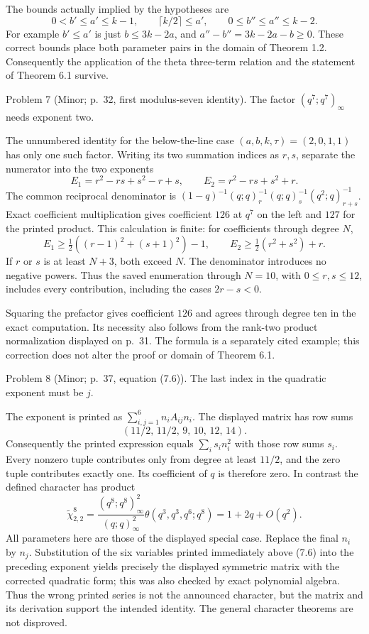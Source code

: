 \documentclass[10pt]{article}
\begin{document}
The bounds actually implied by the hypotheses are \[0<b'\le a'\le k-1,\qquad
 \lceil k/2\rceil\le a',\qquad
 0\le b''\le a''\le k-2.\] For example \(b'\le a'\) is just \(b\le3k-2a\), and \(a''-b''=3k-2a-b\ge0\). These correct bounds place both parameter pairs in the domain of Theorem 1.2. Consequently the application of the theta three-term relation and the statement of Theorem 6.1 survive.\par
Problem 7 (Minor; p. 32, first modulus-seven identity).  The factor \((q^7;q^7)_\infty\) needs exponent two.\par
The unnumbered identity for the below-the-line case \((a,b,k,\tau)=(2,0,1,1)\) has only one such factor. Writing its two summation indices as \(r,s\), separate the numerator into the two exponents \[E_1=r^2-rs+s^2-r+s,\qquad E_2=r^2-rs+s^2+r .\] The common reciprocal denominator is \((1-q)^{-1}(q;q)_r^{-1}(q;q)_s^{-1}(q^2;q)_{r+s}^{-1}\). Exact coefficient multiplication gives coefficient \(126\) at \(q^7\) on the left and \(127\) for the printed product. This calculation is finite: for coefficients through degree \(N\), \[E_1\ge\tfrac12((r-1)^2+(s+1)^2)-1,\qquad
 E_2\ge\tfrac12(r^2+s^2)+r.\] If \(r\) or \(s\) is at least \(N+3\), both exceed \(N\). The denominator introduces no negative powers. Thus the saved enumeration through \(N=10\), with \(0\le r,s\le12\), includes every contribution, including the cases \(2r-s<0\).\par
Squaring the prefactor gives coefficient \(126\) and agrees through degree ten in the exact computation. Its necessity also follows from the rank-two product normalization displayed on p. 31. The formula is a separately cited example; this correction does not alter the proof or domain of Theorem 6.1.\par
Problem 8 (Minor; p. 37, equation (7.6)).  The last index in the quadratic exponent must be \(j\).\par
The exponent is printed as \(\sum_{i,j=1}^6 n_iA_{ij}n_i\). The displayed matrix has row sums \[(11/2,\,11/2,\,9,\,10,\,12,\,14).\] Consequently the printed expression equals \(\sum_i s_i n_i^2\) with those row sums \(s_i\). Every nonzero tuple contributes only from degree at least \(11/2\), and the zero tuple contributes exactly one. Its coefficient of \(q\) is therefore zero. In contrast the defined character has product \[\widetilde\chi^8_{2,2}
 =\frac{(q^8;q^8)_\infty^2}{(q;q)_\infty^2}
   \theta(q^3,q^3,q^6;q^8)=1+2q+O(q^2).\] All parameters here are those of the displayed special case. Replace the final \(n_i\) by \(n_j\). Substitution of the six variables printed immediately above (7.6) into the preceding exponent yields precisely the displayed symmetric matrix with the corrected quadratic form; this was also checked by exact polynomial algebra. Thus the wrong printed series is not the announced character, but the matrix and its derivation support the intended identity. The general character theorems are not disproved.\par
\end{document}
